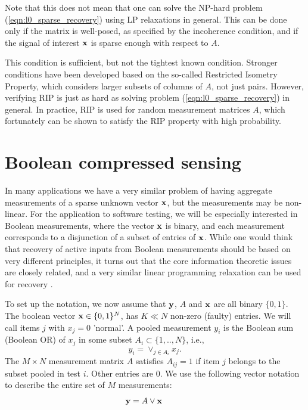 Note that this does not mean that one can solve the NP-hard problem (\ref{eqn:l0_sparse_recovery})
using LP relaxations in general. This can be done only if the matrix is well-posed, as
specified by the incoherence condition, and if the signal of interest $\mathbf{x}$ is sparse enough
with respect to $A$.

This condition is sufficient, but not the tightest known condition.
Stronger conditions have been developed based on the so-called Restricted Isometry Property,
\cite{candes2008_RIP} which considers larger subsets of columns of $A$, not just pairs.
However, verifying RIP is just as hard as solving problem (\ref{eqn:l0_sparse_recovery}) in general. In practice, RIP is used for random measurement
matrices $A$, which fortunately can be shown to satisfy the RIP property with high probability. \\


\section{ Boolean compressed sensing}
\label{s:boolean_compressed_sensing}
In many applications we have a very similar problem of having aggregate measurements
of a sparse unknown vector $\mathbf{x}$, but the measurements may be non-linear.  For the application
to software testing, we will be especially interested in Boolean measurements, where the
vector $\mathbf{x}$ is binary, and each measurement corresponds to a disjunction of a subset
of entries of $\mathbf{x}$.  While one would think that recovery of active inputs from
Boolean measurements should be based on very different principles, it turns
out that the core information theoretic issues are closely related, and a very similar linear
programming relaxation can be used for recovery \cite{Malyutov78,MalioutovM2012}.

To set up the notation, we now assume that $\mathbf{y}$, $A$ and $\mathbf{x}$ are all binary $\{0, 1\}$.
The boolean vector $\mathbf{x} \in \{0, 1\}^N$, has $K \ll N$ non-zero (faulty) entries.
We will call items $j$ with $x_j = 0$ 'normal'. A pooled measurement $y_i$ is the
Boolean sum (Boolean OR) of $x_j$ in some subset $A_i \subset \{1,..,N\}$, i.e.,
\begin{equation}
y_i = \vee_{j \in A_i} x_j.
\end{equation}
The $M \times N$ measurement matrix $A$ satisfies $A_{ij} = 1$ if item $j$ belongs
to the subset pooled in test $i$. Other entries are $0$. We use the following vector
notation to describe the entire set of $M$ measurements:
\begin{equation*}
\mathbf{y} = A \vee \mathbf{x}~~~~~~~~
\end{equation*}

